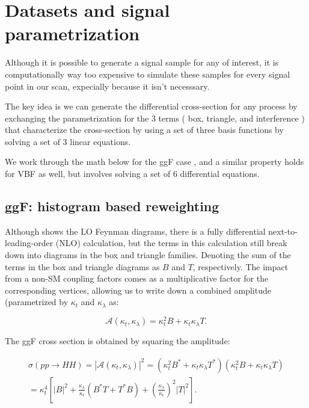 \section{Datasets and signal parametrization}

Although it is possible to generate a signal sample for any \kl of interest, it is computationally way too expensive to simulate these samples for every signal point in our \kl scan, expecially because it isn't necesssary. 

The key idea is we can generate the differential cross-section for any process by exchanging the parametrization for the 3 terms ( box, triangle, and interference ) that characterize the cross-section by using a set of three basis functions by solving a set of 3 linear equations.

We work through the math below for the ggF case \Sect{\ref{subsec:ggF-sig-rw}}, and a similar property holds for VBF as well, but involves solving a set of 6 differential equations.

\subsection{ggF: histogram based reweighting}
\label{subsec:ggF-sig-rw}


Although \Fig{\ref{fig:ggF_feyn_dias}} shows the LO Feynman diagrams, there is a fully differential next-to-leading-order (NLO) calculation, but the terms in this calculation still break down into diagrams in the box and triangle families.
Denoting the sum of the terms in the box and triangle diagrams as $B$ and $T$, respectively.
The impact from a non-SM coupling factors comes as a multiplicative factor for the corresponding vertices, allowing us to write down a combined amplitude (parametrized by $\kappa_t$ and $ \kappa_\lambda$ as:

\begin{equation}
\mathcal{A}(\kappa_t, \kappa_\lambda) = \kappa_t^2 B + \kappa_t \kappa_\lambda T .
\end{equation}


The ggF cross section is obtained by squaring the amplitude:

\begin{align}
	\sigma(pp \rightarrow HH) = |\mathcal{A}(\kappa_t, \kappa_\lambda) |^2 = \left( \kappa_t^2 B^* + \kappa_t \kappa_\lambda T^* \right) \left( \kappa_t^2 B + \kappa_t \kappa_\lambda T \right)  \\
	= \kappa_t^4 \left[ |B|^2 + \frac{\kappa_\lambda}{\kappa_t} (B^* T + T^* B) + \left( \frac{\kappa_\lambda}{\kappa_t}  \right)^2 |T|^2 \right] .
	\label{eq:xsec-kl-kt}
\end{align}

